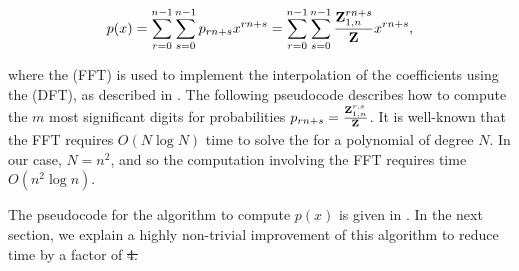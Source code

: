 \documentclass[11pt, oneside]{Thesis} %
\providecommand{\DIFadd}[1]{{\protect\color{blue}\uwave{#1}}} %
\providecommand{\DIFdel}[1]{{\protect\color{red}\sout{#1}}}                      %
\providecommand{\DIFaddbegin}{} %
\providecommand{\DIFaddend}{} %
\providecommand{\DIFdelbegin}{} %
\providecommand{\DIFdelend}{} %
\begin{document}
\begin{align}
\label{eq:ffttwo:pOfX}
p(x) =
\sum_{r=0}^{n-1} \sum_{s=0}^{n-1} p_{rn+s}
 x^{rn+s} =
\sum_{r=0}^{n-1} \sum_{s=0}^{n-1} \frac{\bfZ{rn+s}{1,n}}{\fullZ}
 x^{rn+s},
\end{align}

where the \fft (FFT) is used to implement the
interpolation of
the coefficients using the \idft (DFT), as
described in .  The following pseudocode
describes how
to compute the $m$ most significant digits
for probabilities
$p_{rn+s} = \frac{{\bf Z}^{r,s}_{1,n}}{{\bf Z}^{}_{}}$. It is well-known that
the FFT requires $O(N \log N)$ time to solve the \idft for a polynomial
of degree $N$. In our case,
$N=n^2$, and so the computation involving the FFT requires time $O(n^2 \log n)$.

The pseudocode for the algorithm to compute $p(x)$ is given in
.
In the next section, we explain a highly non-trivial improvement of
this algorithm to reduce time by a factor of \DIFdelbegin \DIFdel{4.
}\DIFdelend \DIFaddbegin \DIFadd{$4$.
}\DIFaddend \medskip
\end{document}
